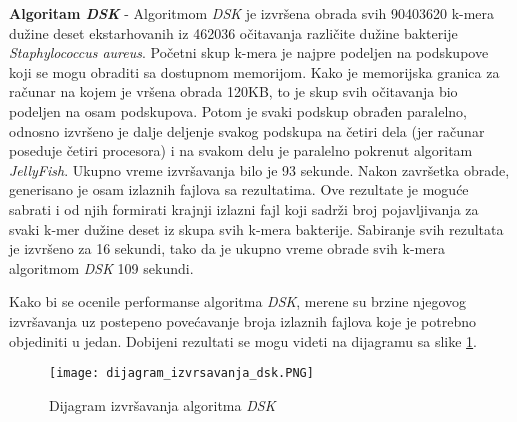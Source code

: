 \documentclass[12pt,oneside]{memoir}
\begin{document}
\textbf{Algoritam \textit{DSK}} - Algoritmom \textit{DSK} je izvršena obrada svih 90403620 k-mera dužine deset ekstarhovanih iz 462036 očitavanja različite dužine bakterije \textit{Staphylococcus aureus}. Početni skup k-mera je najpre podeljen na podskupove koji se mogu obraditi sa dostupnom memorijom. Kako je memorijska granica za računar na kojem je vršena obrada 120KB, to je skup svih očitavanja bio podeljen na osam podskupova. Potom je svaki podskup obrađen paralelno, odnosno izvršeno je dalje deljenje svakog podskupa na četiri dela (jer računar poseduje četiri procesora) i na svakom delu je paralelno pokrenut algoritam \textit{JellyFish}. Ukupno vreme izvršavanja bilo je 93 sekunde. Nakon završetka obrade, generisano je osam izlaznih fajlova sa rezultatima. Ove rezultate je moguće sabrati i od njih formirati krajnji izlazni fajl koji sadrži broj pojavljivanja za svaki k-mer dužine deset iz skupa svih k-mera bakterije. Sabiranje svih rezultata je izvršeno za 16 sekundi, tako da je ukupno vreme obrade svih k-mera algoritmom \textit{DSK} 109 sekundi.

Kako bi se ocenile performanse algoritma \textit{DSK}, merene su brzine njegovog izvršavanja uz postepeno povećavanje broja izlaznih fajlova koje je potrebno objediniti u jedan. Dobijeni rezultati se mogu videti na dijagramu sa slike \ref{fig:dijagramIzvrsavanjaDSK}.

\begin{figure}[!ht]
  \centering
  \texttt{[image: dijagram\_izvrsavanja\_dsk.PNG]}
  \caption{Dijagram izvršavanja algoritma \textit{DSK}}
  \label{fig:dijagramIzvrsavanjaDSK}
\end{figure}

\end{document}
